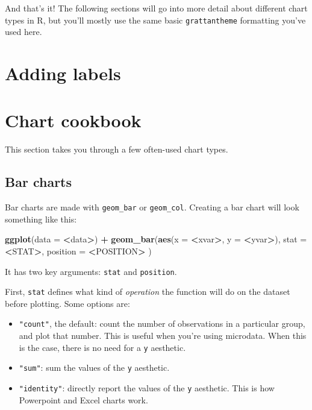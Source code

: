 \documentclass[]{book}
\newenvironment{Shaded}{\begin{snugshade}}{\end{snugshade}}
\newcommand{\DataTypeTok}[1]{\textcolor[rgb]{0.13,0.29,0.53}{#1}}
\newcommand{\KeywordTok}[1]{\textcolor[rgb]{0.13,0.29,0.53}{\textbf{#1}}}
\newcommand{\NormalTok}[1]{#1}
\newcommand{\OperatorTok}[1]{\textcolor[rgb]{0.81,0.36,0.00}{\textbf{#1}}}
\newcommand{\StringTok}[1]{\textcolor[rgb]{0.31,0.60,0.02}{#1}}
\providecommand{\tightlist}{%
  \setlength{\itemsep}{0pt}\setlength{\parskip}{0pt}}
\begin{document}
And that's it! The following sections will go into more detail about different chart types in R, but you'll mostly use the same basic \texttt{grattantheme} formatting you've used here.

\hypertarget{adding-labels}{%
\section{Adding labels}\label{adding-labels}}

\hypertarget{chart-cookbook}{%
\section{Chart cookbook}\label{chart-cookbook}}

This section takes you through a few often-used chart types.

\hypertarget{bar-charts}{%
\subsection{Bar charts}\label{bar-charts}}

Bar charts are made with \texttt{geom\_bar} or \texttt{geom\_col}. Creating a bar chart will look something like this:

\begin{Shaded}
\begin{Highlighting}[]
\KeywordTok{ggplot}\NormalTok{(}\DataTypeTok{data =} \OperatorTok{<}\NormalTok{data}\OperatorTok{>}\NormalTok{) }\OperatorTok{+}\StringTok{ }
\StringTok{  }\KeywordTok{geom_bar}\NormalTok{(}\KeywordTok{aes}\NormalTok{(}\DataTypeTok{x =} \OperatorTok{<}\NormalTok{xvar}\OperatorTok{>}\NormalTok{, }\DataTypeTok{y =} \OperatorTok{<}\NormalTok{yvar}\OperatorTok{>}\NormalTok{),}
     \DataTypeTok{stat =} \OperatorTok{<}\NormalTok{STAT}\OperatorTok{>}\NormalTok{, }
     \DataTypeTok{position =} \OperatorTok{<}\NormalTok{POSITION}\OperatorTok{>}
\StringTok{  }\NormalTok{)}
\end{Highlighting}
\end{Shaded}

It has two key arguments: \texttt{stat} and \texttt{position}.

First, \texttt{stat} defines what kind of \emph{operation} the function will do on the dataset before plotting. Some options are:

\begin{itemize}
\tightlist
\item
  \texttt{"count"}, the default: count the number of observations in a particular group, and plot that number. This is useful when you're using microdata. When this is the case, there is no need for a \texttt{y} aesthetic.
\item
  \texttt{"sum"}: sum the values of the \texttt{y} aesthetic.
\item
  \texttt{"identity"}: directly report the values of the \texttt{y} aesthetic. This is how Powerpoint and Excel charts work.
\end{itemize}
\end{document}

